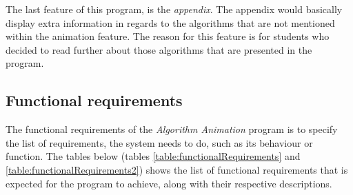 The last feature of this program, is the \textit{appendix}. The appendix would basically display extra information in regards to the algorithms that are not mentioned within the animation feature. The reason for this feature is for students who decided to read further about those algorithms that are presented in the program. 

\subsection{Functional requirements}

The functional requirements of the \textit{Algorithm Animation} program is to specify the list of requirements, the system needs to do, such as its behaviour or function. The tables below (tables \ref{table:functionalRequirements} and \ref{table:functionalRequirements2}) shows the list of functional requirements that is expected for the program to achieve, along with their respective descriptions.  

